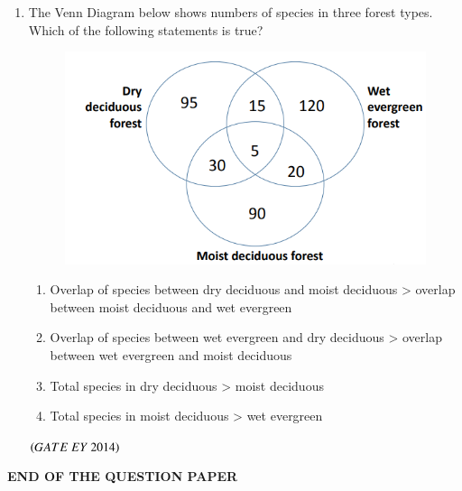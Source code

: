 \documentclass[journal]{IEEEtran}
\numberwithin{equation}{enumi}
\numberwithin{figure}{enumi}
\begin{document}
\begin{enumerate}
    \item The Venn Diagram below shows numbers of species in three forest types. Which of the following statements is true?
    \begin{figure}[H]
    \centering
    \includegraphics[width=0.7\columnwidth]{figs/20.png}
    \caption{}
    \label{fig:20}
   \end{figure}
    \begin{enumerate}
        \item Overlap of species between dry deciduous and moist deciduous > overlap between moist deciduous and wet evergreen
        \item Overlap of species between wet evergreen and dry deciduous > overlap between wet evergreen and moist deciduous
        \item Total species in dry deciduous > moist deciduous
        \item Total species in moist deciduous > wet evergreen
    \end{enumerate}
    \hfill{$\brak{ GATE\ EY\ 2014}$}
    \bigskip
    
\end{enumerate}
\begin{center}
\Large
\textbf{END OF THE QUESTION PAPER}
\end{center}
\end{document}
